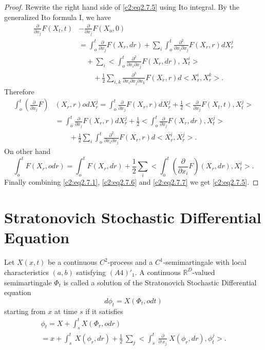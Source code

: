 \begin{proof}%
  Rewrite the right hand side of \ref{c2:eq2.7.5} using Ito integral. By the
  generalized Ito formula I, we have 
  \begin{align*}
    \frac{\partial}{\partial x_j} F(X_t, t) & - \frac{\partial}{\partial
      x_j} F(X_o, 0)\\ 
     & = \int_o^t \frac{\partial}{\partial x_j}  F(X_r, dr) + \sum_i
    \int_o^t \frac{\partial^2}{\partial x_i \partial x_j} F(X_r, r)
    dX_r^j\\ 
    &\quad  + \sum_i  <\int_o^t \frac{\partial^2}{\partial x_i \partial x_j}
    F(X_r, dr), \,  X_t^i>\\ 
    & \qquad + \frac{1}{2} \sum_{i,k} \frac{\partial^3}{\partial x_i \partial x_j
      \partial x_k} F(X_r, r) d<X_r^i, X_r^k>. 
  \end{align*}\pageoriginale
  Therefore
  \begin{align*}
    \int_o^t \left(\frac{\partial}{\partial x_j}F\right) &(X_r, r)
    odX_r^j = \int_o^t \frac{\partial}{\partial x_j} F(X_r, r) dX_r^j +
    \frac{1}{2}<\frac{\partial}{\partial x_j}F(X_t, t), X_t^j >\\ 
    & = \int_o^t \frac{\partial}{\partial x_j}F(X_r,  r) dX_r^j +
    \frac{1}{2} <\int_o^t \frac{\partial}{\partial x_j} F(X_r, dr),
    X_t^j >\\   
    & \qquad + \frac{1}{2} \sum_i \int_o^t \frac{\partial^2}{\partial
      x_i \partial x_j} F(X_r, r)d <X_r^i, X_r^j>. \tag{2.7.6}\label{c2:eq2.7.6}   
  \end{align*}
  On other hand
  \begin{equation*}
    \int_o^t F(X_r, odr) = \int_o^t F(X_r, dr) + \frac{1}{2} \sum_i
    <\int_o^t \left(\frac{\partial}{\partial x_i}F\right) (X_r, dr),
    X_t^i>. \tag{2.7.7}\label{c2:eq2.7.7} 
  \end{equation*}
  Finally combining \eqref{c2:eq2.7.1}, \eqref{c2:eq2.7.6} and 
\eqref{c2:eq2.7.7} we get \eqref{c2:eq2.7.5}.
\end{proof}

\section*{Stratonovich Stochastic Differential Equation}

Let $X(x,t)$ be a continuous $C^2$-process and a $C^1$-semimartingale
with local characteristics $(a,b)$ satisfying $(A4)'_1$. A continuous
$\mathbb{R}^D$-valued semimartingale $\Phi_t$ is called a solution of
the Stratonovich Stochastic Differential equation 
\begin{equation*}
  d \phi_t = X(\Phi_t, odt) \tag{2.7.8}\label{c2:eq2.7.8}
\end{equation*}
starting from $x$ at time  $s$ if it satisfies
\begin{multline*}
 \phi_t = X+ \int_s^t X(\Phi_r, odr) \tag{2.7.9}\label{c2:eq2.7.9}\\
 = x + \int^t_s ~ X(\phi_r,dr) + \frac{1}{2} ~ \sum_j < \int^t_s ~
 \frac{\partial}{\partial ~ x_j} ~ X (\phi_r,dr),\phi^j_t >. 
\end{multline*}\pageoriginale

